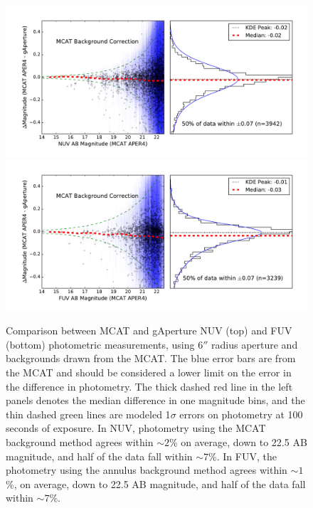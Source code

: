 \documentclass[preprint]{aastex}
\begin{document}
\begin{figure}[t!]
\includegraphics[scale=0.6]{Fig05a.pdf}\\
\includegraphics[scale=0.6]{Fig05b.pdf}
\caption{Comparison between MCAT and gAperture NUV (top) and FUV (bottom) photometric measurements, using $6''$ radius aperture and backgrounds drawn from the MCAT. The blue error bars are from the MCAT and should be considered a lower limit on the error in the difference in photometry. The thick dashed red line in the left panels denotes the median difference in one magnitude bins, and the thin dashed green lines are modeled 1$\sigma$ errors on photometry at 100 seconds of exposure. In NUV, photometry using the MCAT background method agrees within $\sim 2$\% on average, down to 22.5 AB magnitude, and half of the data fall within $\sim 7$\%. In FUV, the photometry using the annulus background method agrees within $\sim 1$\%, on average, down to 22.5 AB magnitude, and half of the data fall within $\sim 7$\%.
\label{mcatrelphot}}
\end{figure}
\clearpage
\end{document}

